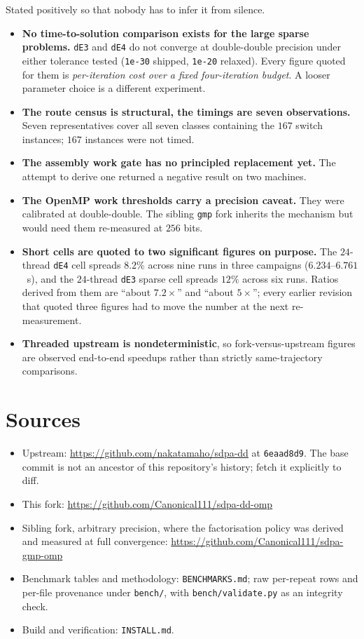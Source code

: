 \documentclass[11pt]{article}
\newcommand{\code}[1]{\texttt{#1}}
\begin{document}
Stated positively so that nobody has to infer it from silence.

\begin{itemize}
\item \textbf{No time-to-solution comparison exists for the large sparse problems.} \code{dE3} and
      \code{dE4} do not converge at double-double precision under either tolerance tested
      (\code{1e-30} shipped, \code{1e-20} relaxed). Every figure quoted for them is
      \emph{per-iteration cost over a fixed four-iteration budget}. A looser parameter choice is a
      different experiment.
\item \textbf{The route census is structural, the timings are seven observations.} Seven
      representatives cover all seven classes containing the $167$ switch instances; $167$
      instances were not timed.
\item \textbf{The assembly work gate has no principled replacement yet.} The attempt to derive one
      returned a negative result on two machines.
\item \textbf{The OpenMP work thresholds carry a precision caveat.} They were calibrated at
      double-double. The sibling \code{gmp} fork inherits the mechanism but would need them
      re-measured at $256$ bits.
\item \textbf{Short cells are quoted to two significant figures on purpose.} The $24$-thread
      \code{dE4} cell spreads $8.2\%$ across nine runs in three campaigns ($6.234$--$6.761$~s), and
      the $24$-thread \code{dE3} sparse cell spreads $12\%$ across six runs. Ratios derived from
      them are ``about $7.2\times$'' and ``about $5\times$''; every earlier revision that quoted
      three figures had to move the number at the next re-measurement.
\item \textbf{Threaded upstream is nondeterministic}, so fork-versus-upstream figures are observed
      end-to-end speedups rather than strictly same-trajectory comparisons.
\end{itemize}

\section{Sources}

\begin{itemize}
\item Upstream: \url{https://github.com/nakatamaho/sdpa-dd} at \code{6eaad8d9}. The base commit is
      not an ancestor of this repository's history; fetch it explicitly to diff.
\item This fork: \url{https://github.com/Canonical111/sdpa-dd-omp}
\item Sibling fork, arbitrary precision, where the factorisation policy was derived and measured at
      full convergence: \url{https://github.com/Canonical111/sdpa-gmp-omp}
\item Benchmark tables and methodology: \code{BENCHMARKS.md}; raw per-repeat rows and per-file
      provenance under \code{bench/}, with \code{bench/validate.py} as an integrity check.
\item Build and verification: \code{INSTALL.md}.
\end{itemize}
\end{document}
